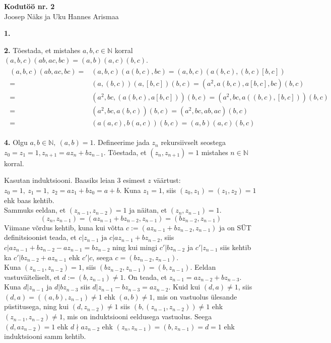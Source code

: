 \documentclass[a4paper, 10pt]{article}
\begin{document}
\begin{center}
\Large\textbf{Kodutöö nr. 2}\\
\small{Joosep Näks ja Uku Hannes Arismaa}
\end{center}
\textbf{1.}

\bigskip

\bigskip
\noindent\textbf{2.} Tõestada, et mistahes $a,b,c\in\mathbb{N}$ korral $(a,b,c)(ab,ac,bc)=(a,b)(a,c)(b,c)$.
\begin{gather*}
\begin{aligned}
(a,b,c)(ab,ac,bc)=&(a,b,c)(a(b,c),bc)=(a,b,c)(a(b,c),(b,c)[b,c])\\
=&(a,(b,c))(a,[b,c])(b,c)=(a^2,a(b,c),a[b,c],bc)(b,c)\\
=&(a^2,bc,(a(b,c),a[b,c]))(b,c)=(a^2,bc,a((b,c),[b,c]))(b,c)\\
=&(a^2,bc,a(b,c))(b,c)=(a^2,bc,ab,ac)(b,c)\\
=&(a(a,c),b(a,c))(b,c)=(a,b)(a,c)(b,c)
\end{aligned}
\end{gather*}
\bigskip

\noindent\textbf{4.} Olgu $a,b\in\mathbb{N},\ (a,b)=1$. Defineerime jada $z_n$ rekursiivselt seostega $z_0=z_1=1, z_{n+1}=az_n+bz_{n-1}$. Tõestada, et $(z_n,z_{n+1})=1$ mistahes $n\in\mathbb{N}$ korral.
\bigskip

Kasutan induktsiooni. Baasiks leian 3 esimest $z$ väärtust: $z_0=1,\ z_1=1,\ z_2=az_1+bz_0=a+b$. Kuna $z_1=1$, siis $(z_0,z_1)=(z_1,z_2)=1$ ehk baas kehtib.\\
Sammuks eeldan, et $(z_{n-1},z_{n-2})=1$ ja näitan, et $(z_n,z_{n-1})=1$. $$(z_n,z_{n-1})=(az_{n-1}+bz_{n-2},z_{n-1})=(bz_{n-2},z_{n-1})$$ Viimane võrdus kehtib, kuna kui võtta $c:=(az_{n-1}+bz_{n-2},z_{n-1})$ ja on SÜT definitsioonist teada, et $c|z_{n-1}\text{ ja }c|az_{n-1}+bz_{n-2}$, siis $c|az_{n-1}+bz_{n-2}-az_{n-1}=bz_{n-2}$ ning kui mingi $c'|bz_{n-2}$ ja $c'|z_{n-1}$ siis kehtib ka $c'|bz_{n-2}+az_{n-1}$ ehk $c'|c$, seega $c=(bz_{n-2},z_{n-1})$.\\
Kuna $(z_{n-1},z_{n-2})=1$, siis $(bz_{n-2},z_{n-1})=(b,z_{n-1})$. Eeldan vastuväiteliselt, et $d:=(b,z_{n-1})\neq1$. On teada, et $z_{n-1}=az_{n-2}+bz_{n-3}$. Kuna $d|z_{n-1}$ ja $d|bz_{n-3}$ siis $d|z_{n-1}-bz_{n-3}=az_{n-2}$. Kuid kui $(d,a)\neq1$, siis $(d,a)=((a,b),z_{n-1})\neq1$ ehk $(a,b)\neq1$, mis on vastuolus ülesande püstitusega, ning kui $(d,z_{n-2})\neq1$ siis $(b,(z_{n-1},z_{n-2}))\neq1$ ehk $(z_{n-1},z_{n-2})\neq1$, mis on induktsiooni eeldusega vastuolus. Seega $(d,az_{n-2})=1$ ehk $d\nmid az_{n-2}$ ehk $(z_n,z_{n-1})=(b,z_{n-1})=d=1$ ehk induktsiooni samm kehtib.
\bigskip
\end{document}
